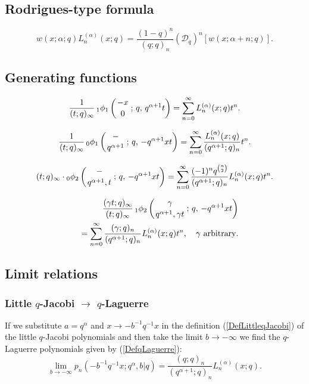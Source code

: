 \documentclass[envcountchap,graybox]{svmono}
\newcommand{\qhyp}[5]{\mbox{}_{#1}{\phi}_{#2}
\left(\genfrac{}{}{0pt}{}{#3}{#4}\,;\,q,\,#5\right)}
\begin{document}
\subsection*{Rodrigues-type formula}
\begin{equation}
\label{RodqLaguerre}
w(x;\alpha;q)L_n^{(\alpha)}(x;q)=
\frac{(1-q)^n}{(q;q)_n}\left(\mathcal{D}_q\right)^n\left[w(x;\alpha+n;q)\right].
\end{equation}

\subsection*{Generating functions}
\begin{equation}
\label{GenqLaguerre1}
\frac{1}{(t;q)_{\infty}}\,\qhyp{1}{1}{-x}{0}{q^{\alpha+1}t}
=\sum_{n=0}^{\infty}L_n^{(\alpha)}(x;q)t^n.
\end{equation}

\begin{equation}
\label{GenqLaguerre2}
\frac{1}{(t;q)_{\infty}}\,\qhyp{0}{1}{-}{q^{\alpha+1}}{-q^{\alpha+1}xt}
=\sum_{n=0}^{\infty}\frac{L_n^{(\alpha)}(x;q)}{(q^{\alpha+1};q)_n}t^n.
\end{equation}

\begin{equation}
\label{GenqLaguerre3}
(t;q)_{\infty}\cdot\qhyp{0}{2}{-}{q^{\alpha+1},t}{-q^{\alpha+1}xt}
=\sum_{n=0}^{\infty}\frac{(-1)^nq^{\binom{n}{2}}}{(q^{\alpha+1};q)_n}L_n^{(\alpha)}(x;q)t^n.
\end{equation}

\begin{eqnarray}
\label{GenqLaguerre4}
& &\frac{(\gamma t;q)_{\infty}}{(t;q)_{\infty}}\,\qhyp{1}{2}{\gamma}{q^{\alpha+1},\gamma t}{-q^{\alpha+1}xt}\nonumber\\
& &{}=\sum_{n=0}^{\infty}\frac{(\gamma;q)_n}{(q^{\alpha+1};q)_n}L_n^{(\alpha)}(x;q)t^n,
\quad\textrm{$\gamma$ arbitrary}.
\end{eqnarray}

\subsection*{Limit relations}

\subsubsection*{Little $q$-Jacobi $\rightarrow$ $q$-Laguerre}
If we substitute $a=q^{\alpha}$ and $x\rightarrow -b^{-1}q^{-1}x$ in the definition
(\ref{DefLittleqJacobi}) of the little $q$-Jacobi polynomials and then take the limit
$b\rightarrow -\infty$ we find the $q$-Laguerre polynomials given by (\ref{DefqLaguerre}):
$$\lim_{b\rightarrow -\infty}p_n(-b^{-1}q^{-1}x;q^{\alpha},b|q)=
\frac{(q;q)_n}{(q^{\alpha+1};q)_n}L_n^{(\alpha)}(x;q).$$
\end{document}

